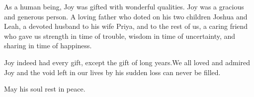 \begin{multicols}{2}
As a human being, Joy was gifted with wonderful qualities. Joy was a gracious and generous person. A loving father who doted on his two children Joshua and Leah, a devoted husband to his wife Priya, and to the rest of us,  a caring friend who gave us strength in time of trouble, wisdom in time of uncertainty, and sharing in time of happiness. 

Joy indeed had every gift, except the gift of long years.We all loved and admired Joy and the void left in our lives by his sudden loss can never be filled.

May his soul rest in peace.


\end{multicols}


